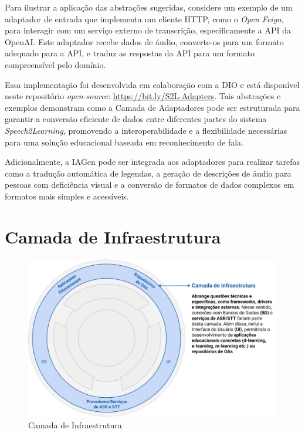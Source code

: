 Para ilustrar a aplicação das abstrações sugeridas, considere um exemplo de um adaptador de entrada que implementa um cliente HTTP, como o \textit{Open Feign}, para interagir com um serviço externo de transcrição, especificamente a API da OpenAI. Este adaptador recebe dados de áudio, converte-os para um formato adequado para a API, e traduz as respostas da API para um formato compreensível pelo domínio. 

Essa implementação foi desenvolvida em colaboração com a DIO e está disponível neste repositório \textit{open-source}: \url{https://bit.ly/S2L-Adapters}. Tais abstrações e exemplos demonstram como a Camada de Adaptadores pode ser estruturada para garantir a conversão eficiente de dados entre diferentes partes do sistema \textit{Speech2Learning}, promovendo a interoperabilidade e a flexibilidade necessárias para uma solução educacional baseada em reconhecimento de fala.

Adicionalmente, a IAGen pode ser integrada aos adaptadores para realizar tarefas como a tradução automática de legendas, a geração de descrições de áudio para pessoas com deficiência visual e a conversão de formatos de dados complexos em formatos mais simples e acessíveis.

\section{Camada de Infraestrutura}

\begin{figure}[htb]
\centering
\caption{Camada de Infraestrutura}
\label{fig:chapter3-speech2learning-layer4}
\includegraphics[width=1\textwidth]{images/chapter3-speech2learning-layer4.png}
\end{figure}

